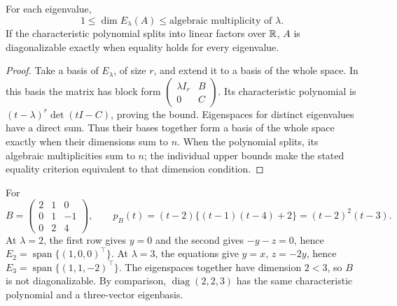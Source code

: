 \begin{proposition}
For each eigenvalue,
\[
 1\leqslant \dim E_\lambda(A)
 \leqslant\text{algebraic multiplicity of }\lambda .
\]
If the characteristic polynomial splits into linear factors over \(\mathbb R\), \(A\) is diagonalizable exactly when equality holds for every
eigenvalue.
\end{proposition}
\begin{proof}
Take a basis of \(E_\lambda\), of size \(r\), and extend it to a basis
of the whole space. In this basis the matrix has block form
\(\begin{pmatrix}\lambda I_r&B\\0&C\end{pmatrix}\).
Its characteristic polynomial is
\((t-\lambda)^r\det(tI-C)\), proving the bound.
Eigenspaces for distinct eigenvalues have a direct sum. Thus their bases
together form a basis of the whole space exactly when their dimensions
sum to \(n\). When the polynomial splits, its algebraic multiplicities
sum to \(n\); the individual upper bounds make the stated equality
criterion equivalent to that dimension condition.
\end{proof}

\begin{example}
For
\[
 B=\begin{pmatrix}2&1&0\\0&1&-1\\0&2&4\end{pmatrix},
 \qquad
 p_B(t)=(t-2)\{(t-1)(t-4)+2\}=(t-2)^2(t-3).
\]
At \(\lambda=2\), the first row gives \(y=0\) and the second gives
\(-y-z=0\), hence \(E_2=\operatorname{span}\{(1,0,0)^\top\}\).
At \(\lambda=3\), the equations give \(y=x\), \(z=-2y\), hence
\(E_3=\operatorname{span}\{(1,1,-2)^\top\}\).
The eigenspaces together have dimension \(2<3\), so \(B\) is not
diagonalizable. By comparison, \(\operatorname{diag}(2,2,3)\) has the
same characteristic polynomial and a three-vector eigenbasis.
\end{example}


